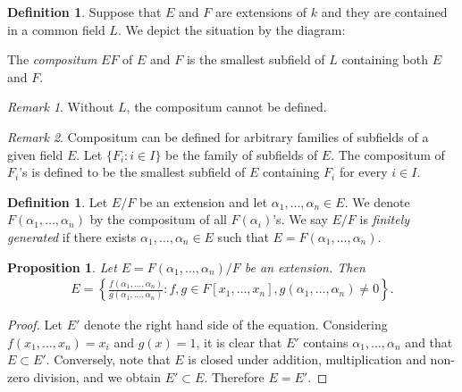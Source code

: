 \documentclass[12pt]{report}
\theoremstyle{plain}
\newtheorem{proposition}[theorem]{Proposition}
\theoremstyle{remark}
\newtheorem*{remark}{Remark}
\theoremstyle{definition}
\newtheorem{definition}[theorem]{Definition}
\begin{document}
\begin{definition}
    Suppose that $E$ and $F$ are extensions of $k$ and they are contained in a common field $L$. We depict the situation by the diagram:
    \begin{figure}[H]
        \centering
    \end{figure}
    \noindent
    The \emph{compositum} $EF$ of $E$ and $F$ is the smallest subfield of $L$ containing both $E$ and $F$.
\end{definition}
\begin{remark}
    Without $L$, the compositum cannot be defined.
\end{remark}
\begin{remark}
    Compositum can be defined for arbitrary families of subfields of a given field $E$. Let $\{F_i:i\in I\}$ be the family of subfields of $E$. The compositum of $F_i$'s is defined to be the smallest subfield of $E$ containing $F_i$ for every $i\in I$.
\end{remark}

\begin{definition}
    Let $E/F$ be an extension and let $\alpha_1,\dots,\alpha_n\in E$. We denote $F(\alpha_1,\dots,\alpha_n)$ by the compositum of all $F(\alpha_i)$'s. We say $E/F$ is \emph{finitely generated} if there exists $\alpha_1,\dots,\alpha_n\in E$ such that $E=F(\alpha_1,\dots,\alpha_n)$.
\end{definition}

\begin{proposition}
    Let $E=F(\alpha_1,\dots,\alpha_n)/F$ be an extension. Then
    \begin{align*}
        E = \left\{ \frac{f(\alpha_1,\dots,\alpha_n)}{g(\alpha_1,\dots,\alpha_n)} : f,g\in F[x_1,\dots,x_n],g(\alpha_1,\dots,\alpha_n)\neq 0 \right\}.
    \end{align*}
\end{proposition}
\begin{proof}
    Let $E'$ denote the right hand side of the equation. Considering $f(x_1,\dots,x_n)=x_i$ and $g(x)=1$, it is clear that $E'$ contains $\alpha_1,\dots,\alpha_n$ and that $E\subset E'$. Conversely, note that $E$ is closed under addition, multiplication and non-zero division, and we obtain $E'\subset E$. Therefore $E=E'$.
\end{proof}
\end{document}
